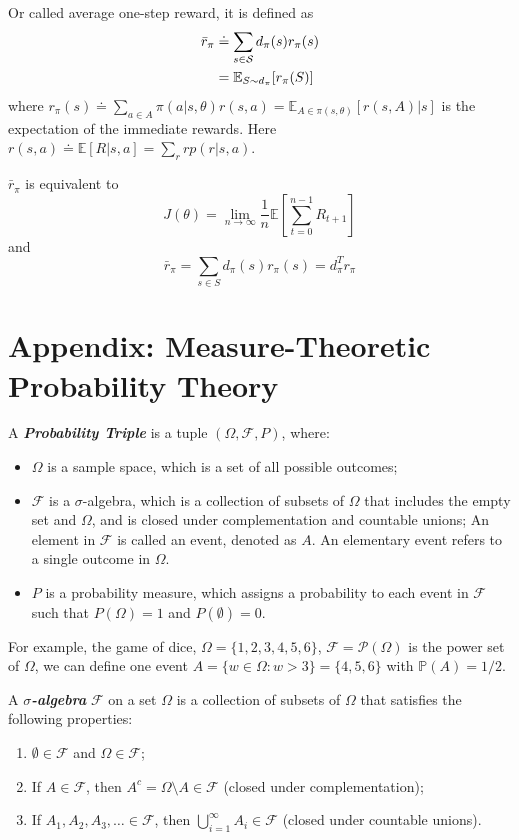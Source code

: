 \documentclass[10pt]{elegantbook}
\newcommand{\mydefination}[1]{\textbf{\textit{\textcolor{structurecolor}{#1}}}}
\begin{document}
\begin{definition}
    Or called average one-step reward, it is defined as
    \begin{align*}
        \bar{r}_{\pi} &\doteq \sum_{s\in{\cal S}}d_{\pi}(s)r_{\pi}(s) \\
        &= \mathbb E_{S\sim d_{\pi}}[r_{\pi}({S})]
    \end{align*}
    where $r_{\pi}(s)\doteq\sum_{a\in A}\pi(a|s,\theta)r(s,a)=\mathbb{E}_{A \in \pi(s,\theta)}[r(s,A)|s]$ is the expectation of the immediate rewards.
    Here $r(s,a)\doteq\mathbb{E}[R|s,a]=\sum_{r}r p(r|s,a)$.

    $\bar r_{\pi}$ is equivalent to
    \[ J(\theta)=\operatorname*{lim}_{n\rightarrow\infty}\frac{1}{n}  \mathbb E \left[\sum_{t=0}^{n-1}R_{t+1}\right] \]
    and
    \[ \bar{r}_{\pi}=\sum_{s\in S}d_{\pi}(s)r_{\pi}(s)=d_{\pi}^{T}r_{\pi} \]
\end{definition}




\section{Appendix: Measure-Theoretic Probability Theory}
A \mydefination{Probability Triple} is a tuple $(\Omega, \mathcal F, P)$, where:
\begin{itemize}
    \item $\Omega$ is a sample space, which is a set of all possible outcomes;
    \item $\mathcal F$ is a $\sigma$-algebra, which is a collection of subsets of $\Omega$ that includes the empty set and $\Omega$, and is closed under complementation and countable unions;
    An element in $\mathcal F$ is called an event, denoted as $A$. An elementary event refers to a single outcome in $\Omega$.
    \item $P$ is a probability measure, which assigns a probability to each event in $\mathcal F$ such that $P(\Omega) = 1$ and $P(\emptyset) = 0$.
\end{itemize}

For example, the game of dice, $\Omega = \{1, 2, 3, 4, 5, 6\}$, $\mathcal F = \mathcal P(\Omega)$ is the power set of $\Omega$, we can define one 
event $A = \{ w \in \Omega : w > 3 \} = \{4, 5, 6 \}$ with $\mathbb P(A) = 1 / 2$. 

\begin{definition}
    A \mydefination{$\sigma$-algebra} $\mathcal F$ on a set $\Omega$ is a collection of subsets of $\Omega$ that satisfies the following properties:
    \begin{enumerate}
        \item $\emptyset \in \mathcal F$ and $\Omega \in \mathcal F$;
        \item If $A \in \mathcal F$, then $A^c = \Omega \setminus A \in \mathcal F$ (closed under complementation);
        \item If $A_1, A_2, A_3, \ldots \in \mathcal F$, then $\bigcup_{i=1}^{\infty} A_i \in \mathcal F$ (closed under countable unions).
    \end{enumerate}
\end{definition}
\end{document}
